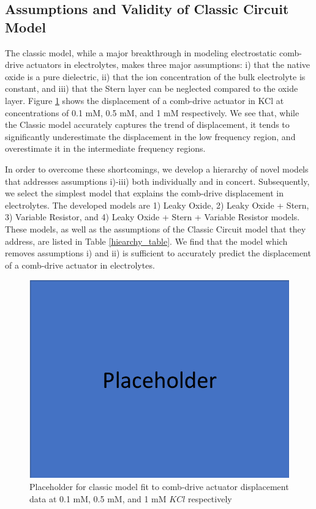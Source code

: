 \subsection{Assumptions and Validity of Classic Circuit Model}
The classic model, while a major breakthrough in modeling electrostatic comb-drive actuators in electrolytes, makes three major assumptions: i) that the native oxide is a pure dielectric, ii) that the ion concentration of the bulk electrolyte is constant, and iii) that the Stern layer can be neglected compared to the oxide layer. Figure \ref{classic_circuit_fit} shows the displacement of a comb-drive actuator in KCl at concentrations of 0.1 mM, 0.5 mM, and 1 mM respectively. We see that, while the Classic model accurately captures the trend of displacement, it tends to significantly underestimate the displacement in the low frequency region, and overestimate it in the intermediate frequency regions. 

In order to overcome these shortcomings, we develop a hierarchy of novel models that addresses assumptions i)-iii) both individually and in concert. Subsequently, we select the simplest model that explains the comb-drive displacement in electrolytes. The developed models are 1) Leaky Oxide, 2) Leaky Oxide + Stern, 3) Variable Resistor, and 4) Leaky Oxide + Stern + Variable Resistor models. These models, as well as the assumptions of the Classic Circuit model that they address, are listed in Table \ref{hiearchy_table}. We find that the model which removes assumptions i) and ii) is sufficient to accurately predict the displacement of a comb-drive actuator in electrolytes.


\begin{figure}[htpb]
    \begin{center}
    \includegraphics[width=0.7\linewidth]{Chapter3/figure/placeholder.png}
    \caption{Placeholder for classic model fit to comb-drive actuator displacement data at 0.1 mM, 0.5 mM, and 1 mM $KCl$ respectively}\label{classic_circuit_fit}
    \end{center}
\end{figure}

